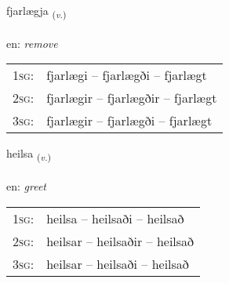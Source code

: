 \documentclass[frontgrid, backgrid]{flacards}\usepackage[]{graphicx}\usepackage[]{xcolor}
\begin{document}
\renewcommand{\flhead}{\vskip5pt \fboxsep=0pt {\small\bfseries\footnotesize Sagnorð | Verb}}
\renewcommand{\fcfoot}{\vskip5pt \fboxsep=0pt \hspace{2pt}{\small\bfseries\footnotesize 3K}}

\renewcommand{\blhead}{\vskip5pt {\small\bfseries\footnotesize Sagnorð | Verb }}
\renewcommand{\bcfoot}{\vskip5pt \hspace{2pt}{\small\bfseries\footnotesize 3K}}


{fjarlægja \small{\textsubscript{(\textit{v.})}} \\[1ex] %
\textphonetic{[fjarlaija]} \\
en: \emph{remove} \\  [2ex]
\renewcommand*{\arraystretch}{0.8}
\begin{tabular}{p{1cm}l}
\textsc{1sg}: & fjarlægi -- fjarlægði -- fjarlægt \\ 
\textsc{2sg}: & fjarlægir -- fjarlægðir -- fjarlægt \\ 
\textsc{3sg}: & fjarlægir -- fjarlægði -- fjarlægt \\ 
\end{tabular}
}

\renewcommand{\flhead}{\vskip5pt \fboxsep=0pt {\small\bfseries\footnotesize Sagnorð | Verb}}
\renewcommand{\fcfoot}{\vskip5pt \fboxsep=0pt \hspace{2pt}{\small\bfseries\footnotesize 3K}}

\renewcommand{\blhead}{\vskip5pt {\small\bfseries\footnotesize Sagnorð | Verb }}
\renewcommand{\bcfoot}{\vskip5pt \hspace{2pt}{\small\bfseries\footnotesize 3K}}


{heilsa \small{\textsubscript{(\textit{v.})}} \\[1ex] %
\textphonetic{[heilsa]} \\
en: \emph{greet} \\  [2ex]
\renewcommand*{\arraystretch}{0.8}
\begin{tabular}{p{1cm}l}
\textsc{1sg}: & heilsa -- heilsaði -- heilsað \\ 
\textsc{2sg}: & heilsar -- heilsaðir -- heilsað \\ 
\textsc{3sg}: & heilsar -- heilsaði -- heilsað \\ 
\end{tabular}
}
\end{document}
